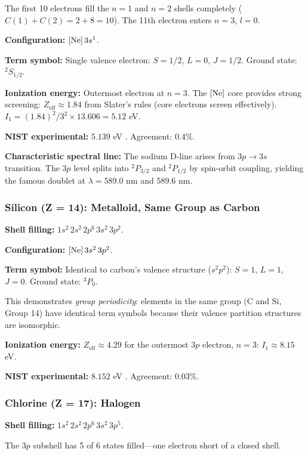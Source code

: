 \documentclass[11pt,a4paper]{article}
\theoremstyle{definition}
\theoremstyle{remark}
\begin{document}
The first 10 electrons fill the $n = 1$ and $n = 2$ shells completely ($C(1) + C(2) = 2 + 8 = 10$). The 11th electron enters $n = 3$, $l = 0$.

\textbf{Configuration:} $[{\rm Ne}]\,3s^1$.

\textbf{Term symbol:} Single valence electron: $S = 1/2$, $L = 0$, $J = 1/2$. Ground state: ${}^2S_{1/2}$.

\textbf{Ionization energy:} Outermost electron at $n = 3$. The $[{\rm Ne}]$ core provides strong screening: $Z_{\mathrm{eff}} \approx 1.84$ from Slater's rules (core electrons screen effectively). $I_1 = (1.84)^2/3^2 \times 13.606 = 5.12$ eV.

\textbf{NIST experimental:} $5.139$ eV \citep{nist_asd}. Agreement: 0.4\%.

\textbf{Characteristic spectral line:} The sodium D-line arises from $3p \to 3s$ transition. The $3p$ level splits into ${}^2P_{3/2}$ and ${}^2P_{1/2}$ by spin-orbit coupling, yielding the famous doublet at $\lambda = 589.0$ nm and $589.6$ nm.

\subsubsection{Silicon (Z = 14): Metalloid, Same Group as Carbon}

\textbf{Shell filling:} $1s^2\,2s^2\,2p^6\,3s^2\,3p^2$.

\textbf{Configuration:} $[{\rm Ne}]\,3s^2\,3p^2$.

\textbf{Term symbol:} Identical to carbon's valence structure ($s^2 p^2$): $S = 1$, $L = 1$, $J = 0$. Ground state: ${}^3P_0$.

This demonstrates \emph{group periodicity}: elements in the same group (C and Si, Group 14) have identical term symbols because their valence partition structures are isomorphic.

\textbf{Ionization energy:} $Z_{\mathrm{eff}} \approx 4.29$ for the outermost $3p$ electron, $n = 3$: $I_1 \approx 8.15$ eV.

\textbf{NIST experimental:} $8.152$ eV \citep{nist_asd}. Agreement: 0.03\%.

\subsubsection{Chlorine (Z = 17): Halogen}

\textbf{Shell filling:} $1s^2\,2s^2\,2p^6\,3s^2\,3p^5$.

The $3p$ subshell has 5 of 6 states filled---one electron short of a closed shell.
\end{document}
